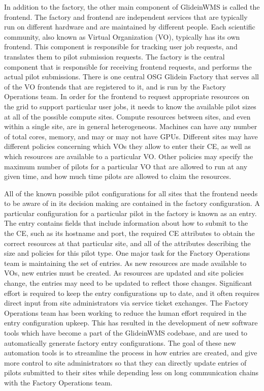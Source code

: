 \documentclass{webofc}
\begin{document}
In addition to the factory, the other main component of GlideinWMS is called the frontend. The factory and frontend are independent services that are typically run on different hardware and are maintained by different people. Each scientific community, also known as Virtual Organization (VO), typically has its own frontend. This component is responsible for tracking user job requests, and translates them to pilot submission requests. The factory is the central component that is responsible for receiving frontend requests, and performs the actual pilot submissions. There is one central OSG Glidein Factory that serves all of the VO frontends that are registered to it, and is run by the Factory Operations team. In order for the frontend to request appropriate resources on the grid to support particular user jobs, it needs to know the available pilot sizes at all of the possible compute sites. %
Compute resources between sites, and even within a single site, are in general heterogeneous. Machines can have any number of total cores, memory, and may or may not have GPUs. Different sites may have different policies concerning which VOs they allow to enter their CE, as well as which resources are available to a particular VO. Other policies may specify the maximum number of pilots for a particular VO that are allowed to run at any given time, and how much time pilots are allowed to claim the resources.

All of the known possible pilot configurations for all sites that the frontend needs to be aware of in its decision making are contained in the factory configuration. A particular configuration for a particular pilot in the factory is known as an entry. The entry contains fields that include information about how to submit to the the CE, such as its hostname and port, the required CE attributes to obtain the correct resources at that particular site, and all of the attributes describing the size and policies for this pilot type. One major task for the Factory Operations team is maintaining the set of entries. As new resources are made available to VOs, new entries must be created. As resources are updated and site policies change, the entries may need to be updated to reflect those changes. Significant effort is required to keep the entry configurations up to date, and it often requires direct input from site administrators via service ticket exchanges. The Factory Operations team has been working to reduce the human effort required in the entry configuration upkeep. This has resulted in the development of new software tools which have become a part of the GlideinWMS codebase, and are used to automatically generate factory entry configurations. The goal of these new automation tools is to streamline the process in how entries are created, and give more control to site administrators so that they can directly update entries of pilots submitted to their sites while depending less on long communication chains with the Factory Operations team.
\end{document}
